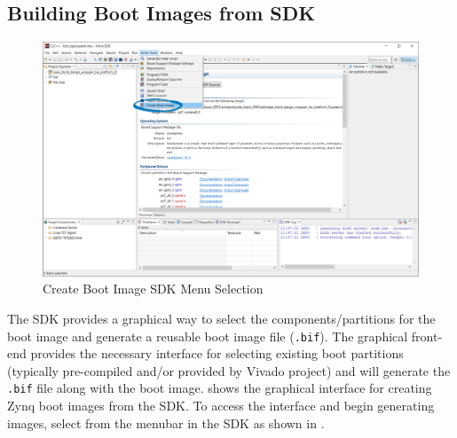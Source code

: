 \subsection{Building Boot Images from SDK}


\begin{figure}
	\centering
	\includegraphics{images/sdk/create_boot_image_menu.png}
	\caption{Create Boot Image SDK Menu Selection}
	\label{fig:createbootimagemenu}
\end{figure}


The SDK provides a graphical way to select the components/partitions for the boot image and generate a reusable boot image file (\texttt{.bif}). The graphical front-end provides the necessary interface for selecting existing boot partitions (typically pre-compiled and/or provided by Vivado project) and will generate the \texttt{.bif} file along with the boot image.  shows the graphical interface for creating Zynq boot images from the SDK. To access the interface and begin generating images, select  from the menubar in the SDK as shown in . \\



